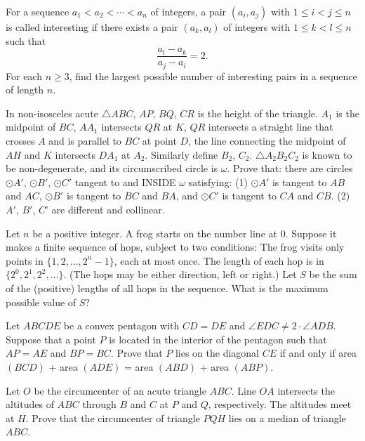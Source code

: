 \documentclass[11pt]{scrartcl}
\begin{document}
\begin{problem}[1270053237908053448]
	For a sequence $a_1<a_2<\cdots<a_n$ of integers, a pair $(a_i,a_j)$ with $1\leq i<j\leq n$ is called interesting if there exists a pair $(a_k,a_l)$ of integers with $1\leq k<l\leq n$ such that$$\frac{a_l-a_k}{a_j-a_i}=2.$$For each $n\geq 3$, find the largest possible number of interesting pairs in a sequence of length $n$.
\end{problem}
\begin{problem}[1293772592063302344]
In non-isosceles acute ${}{\triangle ABC}$, $AP$, $BQ$, $CR$ is the height of the triangle. $A_1$ is the midpoint of $BC$, $AA_1$ intersects $QR$ at $K$, $QR$ intersects a straight line that crosses ${A}$ and is parallel to $BC$ at point ${D}$, the line connecting the midpoint of $AH$ and ${K}$ intersects $DA_1$ at $A_2$. Similarly define $B_2$, $C_2$. ${}\triangle A_2B_2C_2$ is known to be non-degenerate, and its circumscribed circle is $\omega$. Prove that: there are circles $\odot A'$, $\odot B'$, $\odot C'$ tangent to and INSIDE $\omega$ satisfying:
(1) $\odot A'$ is tangent to $AB$ and $AC$, $\odot B'$ is tangent to $BC$ and $BA$, and $\odot C'$ is tangent to $CA$ and $CB$.
(2) $A'$, $B'$, $C$' are different and collinear.
\end{problem}
\begin{problem}[1302548092028853470]
Let $n$ be a positive integer. A frog starts on the number line at $0$. Suppose it makes a finite sequence of hops, subject to two conditions:
The frog visits only points in $\{1, 2, \dots, 2^n-1\}$, each at most once.
The length of each hop is in $\{2^0, 2^1, 2^2, \dots\}$. (The hops may be either direction, left or right.)
Let $S$ be the sum of the (positive) lengths of all hops in the sequence. What is the maximum possible value of $S$?
\end{problem}
\begin{problem}[1336030836839904136]
Let $ABCDE$ be a convex pentagon with $CD= DE$ and $\angle EDC \ne 2 \cdot \angle ADB$.
Suppose that a point $P$ is located in the interior of the pentagon such that $AP =AE$ and $BP= BC$.
Prove that $P$ lies on the diagonal $CE$ if and only if area $(BCD)$ + area $(ADE)$ = area $(ABD)$ + area $(ABP)$.
\end{problem}
\begin{problem}[1366302870241512636]
Let $O$ be the circumcenter of an acute triangle $ABC$. Line $OA$ intersects the altitudes of $ABC$ through $B$ and $C$ at $P$ and $Q$, respectively. The altitudes meet at $H$. Prove that the circumcenter of triangle $PQH$ lies on a median of triangle $ABC$.
\end{problem}
\end{document}
